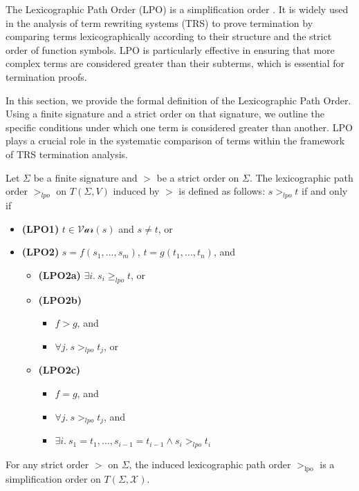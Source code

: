     The Lexicographic Path Order (LPO) \cite{dershowitz1982orderings} is a simplification order . It is widely used in the analysis of term rewriting systems (TRS) to prove termination by comparing terms lexicographically according to their structure and the strict order of function symbols. LPO is particularly effective in ensuring that more complex terms are considered greater than their subterms, which is essential for termination proofs.

In this section, we provide the formal definition of the Lexicographic Path Order. Using a finite signature and a strict order on that signature, we outline the specific conditions under which one term is considered greater than another. LPO plays a crucial role in the systematic comparison of terms within the framework of TRS termination analysis.
    
    \begin{definition}
    Let $\Sigma$ be a finite signature and $>$ be a strict order on $\Sigma$. The lexicographic path order $>_{lpo}$ on $T(\Sigma,V)$ induced by $>$ is defined as follows: \( s >_{lpo} t \) if and only if
    \begin{itemize}
        \item \textbf{(LPO1)} $t \in \mathcal{Var}(s)$ and $s \neq t$, or
        \item \textbf{(LPO2)} $s = f(s_1, \ldots, s_m)$, $t = g(t_1, \ldots, t_n)$, and
        \begin{itemize}
            \item \textbf{(LPO2a)} $\exists i.\ s_i \ge_{lpo} t$, or
            \item \textbf{(LPO2b)}
            \begin{itemize}
                \item $f > g$, and
                \item $\forall j.\ s >_{lpo} t_j$, or
            \end{itemize}
            \item \textbf{(LPO2c)}
            \begin{itemize}
                \item $f = g$, and
                \item $\forall j.\ s >_{lpo} t_j$, and
                \item $\exists i.\ s_1 = t_1, \ldots, s_{i-1} = t_{i-1} \land s_i >_{lpo} t_i$
            \end{itemize}
        \end{itemize}
    \end{itemize}
    \end{definition}
    
\begin{theorem}
    For any strict order $>$ on $\Sigma$, the induced lexicographic path order $>_{\text{lpo}}$ is a simplification order on $T(\Sigma, \mathcal{X})$.
\end{theorem}
